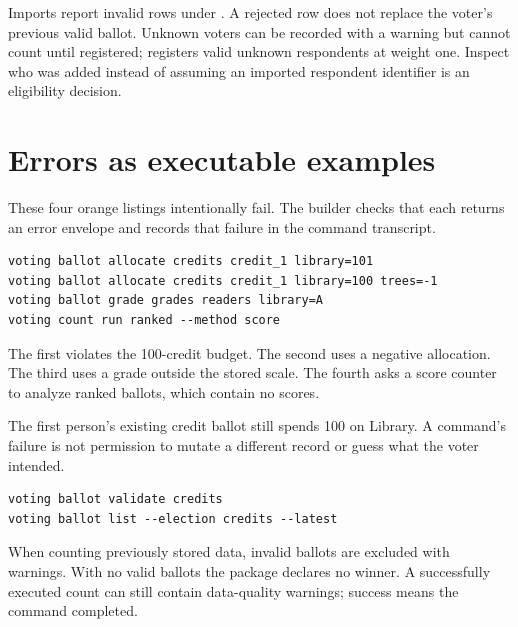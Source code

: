 Imports report invalid rows under . A rejected row does not replace the voter's previous valid ballot. Unknown voters can be recorded with a warning but cannot count until registered;  registers valid unknown respondents at weight one. Inspect who was added instead of assuming an imported respondent identifier is an eligibility decision.

\section{Errors as executable examples}
These four orange listings intentionally fail. The builder checks that each returns an error envelope and records that failure in the command transcript.
\begin{lstlisting}[style=votingerror]
voting ballot allocate credits credit_1 library=101
voting ballot allocate credits credit_1 library=100 trees=-1
voting ballot grade grades readers library=A
voting count run ranked --method score
\end{lstlisting}
The first violates the 100-credit budget. The second uses a negative allocation. The third uses a grade outside the stored scale. The fourth asks a score counter to analyze ranked ballots, which contain no scores.

The first person's existing credit ballot still spends 100 on Library. A command's failure is not permission to mutate a different record or guess what the voter intended.
\begin{lstlisting}[style=votingrun]
voting ballot validate credits
voting ballot list --election credits --latest
\end{lstlisting}
When counting previously stored data, invalid ballots are excluded with warnings. With no valid ballots the package declares no winner. A successfully executed count can still contain data-quality warnings; success means the command completed.

